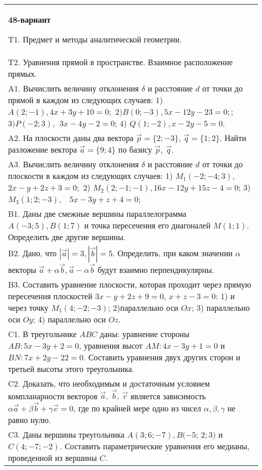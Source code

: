 \documentclass{article}
\begin{document}
\begin{tabular}{m{17cm}}
\textbf{48-вариант}
\newline

T1. Предмет и методы аналитической геометрии.
 \\
T2. 
Уравнения прямой в пространстве. Взаимное расположение прямых.
 \\
A1. 
Вычислить величину отклонения \(\delta\) и расстояние \(d\) от точки до прямой в каждом из следующих случаев: 1) \(A(2; - 1),4x + 3y + 10 = 0;\) \(2)B(0; - 3),5x - 12y - 23 = 0;\); \(3)P( - 2;3),\ \ 3x - 4y - 2 = 0\); 4) \(Q(1; - 2),x - 2y - 5 = 0\).
 \\
A2. 
На плоскости даны два вектора \(\overrightarrow{p} = \{ 2; - 3\}\), \(\overrightarrow{q} = \{ 1;2\}\). Найти разложение вектора \(\overrightarrow{a} = \{ 9;4\}\) по базису \(\overrightarrow{p},\ \overrightarrow{q}\).
 \\
A3. 
Вычислить величину отклонения \(\delta\) и расстояние \(d\) от точки до плоскости в каждом из следующих случаев: 1) \(M_{1}( - 2; - 4;3)\), \(2x - y + 2z + 3 = 0;\) 2) \(M_{2}(2; - 1; - 1),16x - 12y + 15z - 4 = 0\); 3) \(M_{3}(1;2; - 3),\ \ \ \ 5x - 3y + z + 4 = 0\);
 \\
B1. 
Даны две смежные вершины параллелограмма \(A( - 3;5),B(1;7)\) и точка пересечения его диагоналей \(M(1;1)\). Определить две другие вершины.
 \\
B2. 
Дано, что \(|\overrightarrow{a}| = 3,|\overrightarrow{b}| = 5\). Определить, при каком значении \(\alpha\) векторы \(\overrightarrow{a} + \alpha\overrightarrow{b},\overrightarrow{a} - \alpha\overrightarrow{b}\) будут взаимно перпендикулярны.
 \\
B3. 
Составить уравнение плоскости, которая проходит через прямую пересечения плоскостей \(3x - y + 2z + 9 = 0\), \(x + z - 3 = 0\): 1) и через точку \(M_{1}(4; - 2; - 3)\); 2)параллельно оси \(Ox\); 3) параллельно оси \(Oy\); 4) параллельно оси \(Oz\).
 \\
C1. 
В треугольнике \(ABC\) даны: уравнение стороны \(AB:5x - 3y + 2 = 0\), уравнения высот \(AM:4x - 3y + 1 = 0\) и \(BN:7x + 2y - 22 = 0\). Составить уравнения двух других сторон и третьей высоты этого треугольника.
 \\
C2. 
Доказать, что необходимым и достаточным условием компланарности векторов \(\overrightarrow{a},\ \overrightarrow{b},\ \overrightarrow{c}\) является зависимость \(\alpha\overrightarrow{a} + \beta\overrightarrow{b} + \gamma\overrightarrow{c} = 0\), где по крайней мере одно из чисел \(\alpha,\beta,\gamma\) не равно нулю. \\
C3. 
Даны вершины треугольника \(A(3;6; - 7),B( - 5\); \(2;3)\) и \(C(4; - 7; - 2)\). Составить параметрические уравнения его медианы, проведенной из вершины \(C\).
 \\

\end{tabular}
\vspace{1cm}
\end{document}
